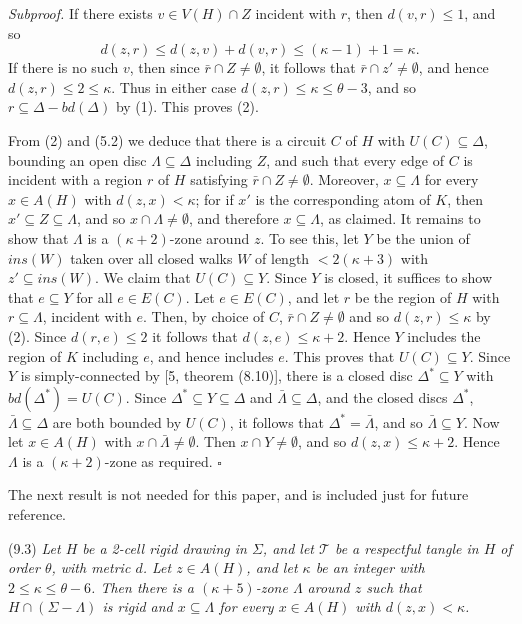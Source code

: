 \textit{Subproof.} If there exists $v \in V(H) \cap Z$ incident with $r$, then $d(v, r) \le 1$, and so
\begin{equation*}
d(z, r) \le d(z, v) + d(v, r) \le (\kappa - 1) + 1 = \kappa.
\end{equation*}
If there is no such $v$, then since $\bar{r} \cap Z \ne \emptyset$, it follows that $\bar{r} \cap z' \ne \emptyset$, and hence $d(z, r) \le 2 \le \kappa$. Thus in either case $d(z, r) \le \kappa \le \theta - 3$, and so $r \subseteq \Delta - bd(\Delta)$ by (1). This proves (2).

From (2) and (5.2) we deduce that there is a circuit $C$ of $H$ with $U(C) \subseteq \Delta$, bounding an open disc $\Lambda \subseteq \Delta$ including $Z$, and such that every edge of $C$ is incident with a region $r$ of $H$ satisfying $\bar{r} \cap Z \ne \emptyset$. Moreover, $x \subseteq \Lambda$ for every $x \in A(H)$ with $d(z, x) < \kappa$; for if $x'$ is the corresponding atom of $K$, then $x' \subseteq Z \subseteq \Lambda$, and so $x \cap \Lambda \ne \emptyset$, and therefore $x \subseteq \Lambda$, as claimed. It remains to show that $\Lambda$ is a $(\kappa + 2)$-zone around $z$. To see this, let $Y$ be the union of $ins(W)$ taken over all closed walks $W$ of length $< 2(\kappa + 3)$ with $z' \subseteq ins(W)$. We claim that $U(C) \subseteq Y$. Since $Y$ is closed, it suffices to show that $e \subseteq Y$ for all $e \in E(C)$. Let $e \in E(C)$, and let $r$ be the region of $H$ with $r \subseteq \Lambda$, incident with $e$. Then, by choice of $C$, $\bar{r} \cap Z \ne \emptyset$ and so $d(z, r) \le \kappa$ by (2). Since $d(r, e) \le 2$ it follows that $d(z, e) \le \kappa + 2$. Hence $Y$ includes the region of $K$ including $e$, and hence includes $e$. This proves that $U(C) \subseteq Y$. Since $Y$ is simply-connected by [5, theorem (8.10)], there is a closed disc $\Delta^* \subseteq Y$ with $bd(\Delta^*) = U(C)$. Since $\Delta^* \subseteq Y \subseteq \Delta$ and $\bar{\Lambda} \subseteq \Delta$, and the closed discs $\Delta^*$, $\bar{\Lambda} \subseteq \Delta$ are both bounded by $U(C)$, it follows that $\Delta^* = \bar{\Lambda}$, and so $\bar{\Lambda} \subseteq Y$. Now let $x \in A(H)$ with $x \cap \bar{\Lambda} \ne \emptyset$. Then $x \cap Y \ne \emptyset$, and so $d(z, x) \le \kappa + 2$. Hence $\Lambda$ is a $(\kappa + 2)$-zone as required. $\square$

The next result is not needed for this paper, and is included just for future reference.

\stmt
(9.3) \textit{Let $H$ be a 2-cell rigid drawing in $\Sigma$, and let $\mathscr{T}$ be a respectful tangle in $H$ of order $\theta$, with metric $d$. Let $z \in A(H)$, and let $\kappa$ be an integer with $2 \le \kappa \le \theta - 6$. Then there is a $(\kappa + 5)$-zone $\Lambda$ around $z$ such that $H \cap (\Sigma - \Lambda)$ is rigid and $x \subseteq \Lambda$ for every $x \in A(H)$ with $d(z, x) < \kappa$.}

